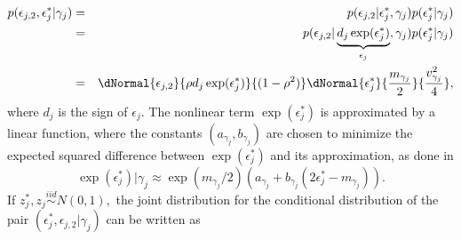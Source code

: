 \begin{eqnarray*}
	p( \epsilon_{j,2}, \epsilon_{j}^* | \gamma_j ) &=& p( \epsilon_{j,2} | \epsilon_{j}^*, \gamma_j ) p( \epsilon_{j}^* | \gamma_j) \\
	&=& p( \epsilon_{j,2} | \underbrace{ d_j \exp( \epsilon_{j}^* ) }_{\epsilon_{j}}, \gamma_j ) p( \epsilon_{j}^* | \gamma_j) \\
	&=& \dNormal{\epsilon_{j,2}}{\rho d_j \exp( \epsilon_{j}^* )}{(1-\rho^2) } \dNormal{\epsilon_{j}^*}{ \frac{m_{\gamma_j}}{2} }{ \frac{v_{\gamma_j}^2}{4} },
\end{eqnarray*}
where $d_j$ is the sign of $\epsilon_{j}$. The nonlinear term $\exp( \epsilon_{j}^* )$ is approximated by a linear function, where the constants $(a_{\gamma_j}, b_{\gamma_j})$ are chosen to minimize the expected squared difference between $\exp(\epsilon_{j}^*)$ and its approximation, as done in \cite{omori2007stochastic}
\[
\exp( \epsilon_{j}^* ) | \gamma_j \approx \exp(m_{\gamma_j} /2) (a_{\gamma_j} + b_{\gamma_j}( 2\epsilon_{j}^* - m_{\gamma_j} ) ).
\]
If $z_{j}^*, z_{j} \stackrel{iid}{\sim} N(0,1),$ the joint distribution for the conditional distribution of the pair $(\epsilon_{j}^*, \epsilon_{j,2} | \gamma_j)$ can be written as

